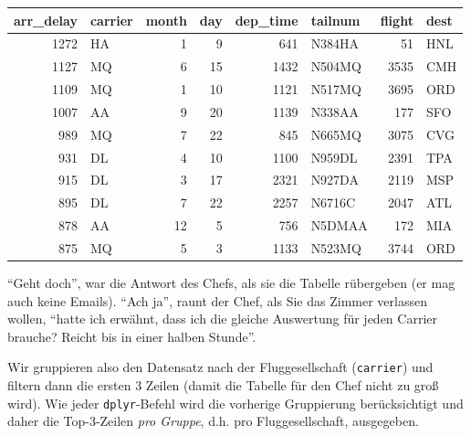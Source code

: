 \documentclass[12pt,]{book}
\makeatletter
\newenvironment{Shaded}{\begin{snugshade}}{\end{snugshade}}
\newcommand{\KeywordTok}[1]{\textcolor[rgb]{0.13,0.29,0.53}{\textbf{{#1}}}}
\newcommand{\DecValTok}[1]{\textcolor[rgb]{0.00,0.00,0.81}{{#1}}}
\newcommand{\StringTok}[1]{\textcolor[rgb]{0.31,0.60,0.02}{{#1}}}
\newcommand{\CommentTok}[1]{\textcolor[rgb]{0.56,0.35,0.01}{\textit{{#1}}}}
\newcommand{\NormalTok}[1]{{#1}}
\newenvironment{kframe}{%
\medskip{}
\setlength{\fboxsep}{.8em}
 \def\at@end@of@kframe{}%
 \ifinner\ifhmode%
  \def\at@end@of@kframe{\end{minipage}}%
  \begin{minipage}{\columnwidth}%
 \fi\fi%
 \def\FrameCommand##1{\hskip\@totalleftmargin \hskip-\fboxsep
 \colorbox{shadecolor}{##1}\hskip-\fboxsep
     \hskip-\linewidth \hskip-\@totalleftmargin \hskip\columnwidth}%
 \MakeFramed {\advance\hsize-\width
   \@totalleftmargin\z@ \linewidth\hsize
   \@setminipage}}%
 {\par\unskip\endMakeFramed%
 \at@end@of@kframe}
\renewenvironment{Shaded}{\begin{kframe}}{\end{kframe}}
\makeatother
\begin{document}
\begin{tabular}{r|l|r|r|r|l|r|l}
\hline
arr\_delay & carrier & month & day & dep\_time & tailnum & flight & dest\\
\hline
1272 & HA & 1 & 9 & 641 & N384HA & 51 & HNL\\
\hline
1127 & MQ & 6 & 15 & 1432 & N504MQ & 3535 & CMH\\
\hline
1109 & MQ & 1 & 10 & 1121 & N517MQ & 3695 & ORD\\
\hline
1007 & AA & 9 & 20 & 1139 & N338AA & 177 & SFO\\
\hline
989 & MQ & 7 & 22 & 845 & N665MQ & 3075 & CVG\\
\hline
931 & DL & 4 & 10 & 1100 & N959DL & 2391 & TPA\\
\hline
915 & DL & 3 & 17 & 2321 & N927DA & 2119 & MSP\\
\hline
895 & DL & 7 & 22 & 2257 & N6716C & 2047 & ATL\\
\hline
878 & AA & 12 & 5 & 756 & N5DMAA & 172 & MIA\\
\hline
875 & MQ & 5 & 3 & 1133 & N523MQ & 3744 & ORD\\
\hline
\end{tabular}

``Geht doch'', war die Antwort des Chefs, als sie die Tabelle rübergeben
(er mag auch keine Emails). ``Ach ja'', raunt der Chef, als Sie das
Zimmer verlassen wollen, ``hatte ich erwähnt, dass ich die gleiche
Auswertung für jeden Carrier brauche? Reicht bis in einer halben
Stunde''.

Wir gruppieren also den Datensatz nach der Fluggesellschaft
(\texttt{carrier}) und filtern dann die ersten 3 Zeilen (damit die
Tabelle für den Chef nicht zu groß wird). Wie jeder
\texttt{dplyr}-Befehl wird die vorherige Gruppierung berücksichtigt und
daher die Top-3-Zeilen \emph{pro Gruppe}, d.h. pro Fluggesellschaft,
ausgegeben.

\begin{Shaded}
\end{Shaded}
\end{document}
